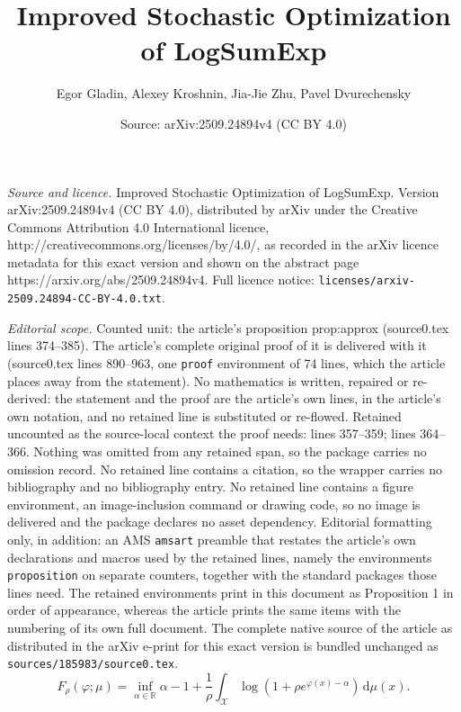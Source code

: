 \documentclass[10pt,a4paper]{amsart}
\title{Improved Stochastic Optimization of LogSumExp}
\author{Egor Gladin, Alexey Kroshnin, Jia-Jie Zhu, Pavel Dvurechensky}
\date{Source: arXiv:2509.24894v4 (CC BY 4.0)}
\newcommand{\R}{\mathbb{R}}
\def\cX{\mathcal{X}}
\newcommand{\dd}{\,\mathrm{d}}
\begin{document}
\maketitle

\noindent\emph{Source and licence.} Improved Stochastic Optimization of LogSumExp. Version arXiv:2509.24894v4 (CC BY 4.0), distributed by arXiv under the Creative Commons Attribution 4.0 International licence, http://creativecommons.org/licenses/by/4.0/, as recorded in the arXiv licence metadata for this exact version and shown on the abstract page https://arxiv.org/abs/2509.24894v4. Full licence notice: \texttt{licenses/arxiv-2509.24894-CC-BY-4.0.txt}.\par\smallskip

\noindent\textit{Editorial scope.} Counted unit: the article's proposition prop:approx (source0.tex lines 374--385). The article's complete original proof of it is delivered with it (source0.tex lines 890--963, one \texttt{proof} environment of 74 lines, which the article places away from the statement). No mathematics is written, repaired or re-derived: the statement and the proof are the article's own lines, in the article's own notation, and no retained line is substituted or re-flowed.  Retained uncounted as the source-local context the proof needs: lines 357--359; lines 364--366.  Nothing was omitted from any retained span, so the package carries no omission record.  No retained line contains a citation, so the wrapper carries no bibliography and no bibliography entry.  No retained line contains a figure environment, an image-inclusion command or drawing code, so no image is delivered and the package declares no asset dependency.  Editorial formatting only, in addition: an AMS \texttt{amsart} preamble that restates the article's own declarations and macros used by the retained lines, namely the environments \texttt{proposition} on separate counters, together with the standard packages those lines need.  The retained environments print in this document as Proposition 1 in order of appearance, whereas the article prints the same items with the numbering of its own full document.  The complete native source of the article as distributed in the arXiv e-print for this exact version is bundled unchanged as \texttt{sources/185983/source0.tex}.
    \begin{equation}\label{eq:F_rho_dual}
        F_\rho(\varphi ; \mu) = \inf_{\alpha \in \R} \alpha - 1 + \frac{1}{\rho} \int_{\cX} \log\left(1 + \rho e^{\varphi(x) - \alpha}\right) \dd \mu(x) .
    \end{equation}
\end{document}
